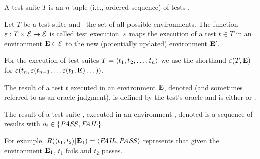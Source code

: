 \begin{definition}
A test suite\/ $T$ is an $n$-tuple (i.e., ordered sequence) of tests
.

\end{definition}

\begin{definition}
Let\/ $T$ be a test suite and\/ \environs\ the set of all possible
environments.
The function\/ $\varepsilon: T \times \mathcal{E} \rightarrow
\mathcal{E}$ is called test
execution. $\varepsilon$ maps the execution of a test\/ $ t \in T$ 
in an environment\/ $\mathbf{E} \in \mathcal{E}$ to the new (potentially updated)
environment\/ $\mathbf{E}'$.

For the execution of test suites\/ $T =  \langle t_1, t_2, \dots, t_n \rangle $
we use the shorthand\/
$\varepsilon(T,\mathbf{E})$ for $\varepsilon(t_n,\varepsilon(t_{n-1},\dots \varepsilon(t_1,\mathbf{E}) \dots ))$.
\end{definition}

\begin{definition}
The result of a test $t$ executed in an environment\/ $\mathbf{E}$,
denoted\/  (and sometimes referred to 
as an oracle judgment), is defined by the test's oracle
and is either \pass or \fail.

The result of a test suite\/ , executed in an
environment\/ \env, denoted\/  is a
sequence of results\/  with $o_i \in \{\mathit{PASS},\mathit{FAIL}\}$.


For example, $R( \langle t_1, t_2 \rangle |\mathbf{E}_1) =  \langle \mathit{FAIL}, \mathit{PASS} \rangle $ represents that 
given the environment\/ $\mathbf{E}_1$, $t_1$ fails and\/ $t_2$ passes.
\end{definition}


%

